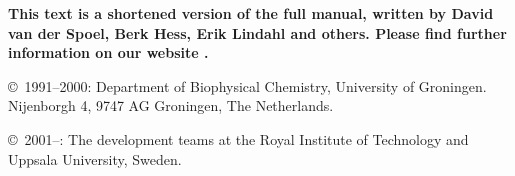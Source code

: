 \documentclass[11pt,a4paper,twoside]{gmxmanual}
\newcommand{\gmxlite}{0}
\begin{document}
\ifthenelse{\equal{\gmxlite}{1}} 
{
\newpage
{\bf
This text is a shortened version of the full {\gromacs} manual, written
by David van der Spoel, Berk Hess, Erik Lindahl and others. Please
find further information on our website {\wwwpage}.}

\vspace{2cm}

\noindent \copyright\ 1991--2000: 
Department of Biophysical Chemistry, University of Groningen. 
Nijenborgh 4, 9747 AG Groningen, The Netherlands.\\
\medskip

\noindent \copyright\ 2001--{\gmxyear}:
The {\gromacs} development teams at the Royal Institute of Technology and \\
Uppsala University, Sweden.
} 
{ 
\cleardoublepage
} %
\addtolength{\oddsidemargin}{5mm}

%
%
\renewcommand{\chaptermark}[1]{\markboth{#1}{#1}} %
\renewcommand{\sectionmark}[1]{\markright{\thesection\ #1}}
\lhead[\fancyplain{}{\em\thepage}]{\fancyplain{}{\em\rightmark}}
\rhead[\fancyplain{}{\em\leftmark}]{\fancyplain{}{\em\thepage}}
\cfoot{}
\end{document}

